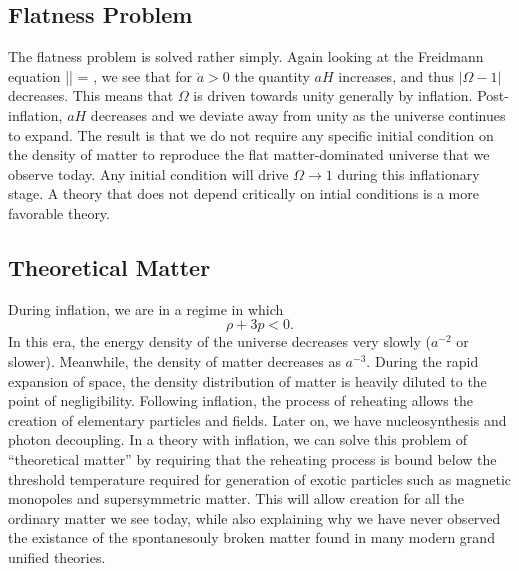 \documentclass[10pt,letterpaper]{article}
\begin{document}
\subsection{Flatness Problem}
The flatness problem is solved rather simply. Again looking at the Freidmann equation
\be
	|| = ,
\ee
we see that for $\ddot a>0$ the quantity $aH$ increases, and thus $|\Omega -1|$ decreases. This means that $\Omega$ is driven towards unity generally by inflation. Post-inflation, $aH$ decreases and we deviate away from unity as the universe continues to expand. The result is that we do not require any specific initial condition on the density of matter to reproduce the flat matter-dominated universe that we observe today. Any initial condition will drive $\Omega \to 1$ during this inflationary stage. A theory that does not depend critically on intial conditions is a more favorable theory.
 \subsection{Theoretical Matter}
 During inflation, we are in a regime in which
 \[
 	\rho+3p <0.
\]
In this era, the energy density of the universe decreases very slowly ($a^{-2}$ or slower). Meanwhile, the density of matter decreases as $a^{-3}$. During the rapid expansion of space, the density distribution of matter is heavily diluted to the point of negligibility. Following inflation, the process of reheating allows the creation of elementary particles and fields. Later on, we have nucleosynthesis and photon decoupling. In a theory with inflation, we can solve this problem of ``theoretical matter'' by requiring that the reheating process is bound below the threshold temperature required for generation of exotic particles such as magnetic monopoles and supersymmetric matter. This will allow creation for all the ordinary matter we see today, while also explaining why we have never observed the existance of the spontanesouly broken matter found in many modern grand unified theories. 
\end{document}
